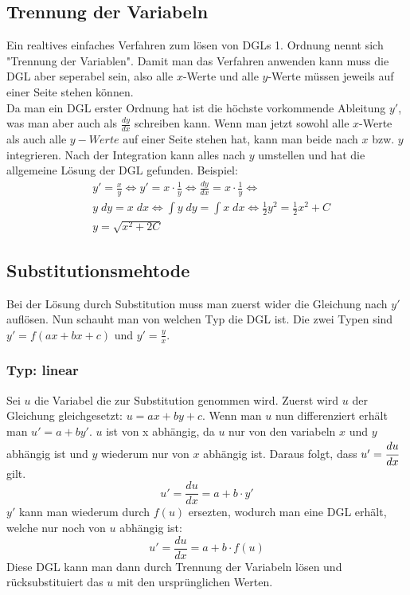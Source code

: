 \documentclass[a4paper,10pt]{scrartcl}
\begin{document}
        \subsection{Trennung der Variabeln}
        Ein realtives einfaches Verfahren zum lösen von DGLs 1. Ordnung nennt sich "Trennung der Variablen". Damit man das Verfahren anwenden kann muss die DGL aber
        seperabel sein, also alle \(x\)-Werte und alle \(y\)-Werte müssen jeweils auf einer Seite stehen können. \\
        Da man ein DGL erster Ordnung hat ist die höchste vorkommende Ableitung \(y'\), was man aber auch als \(\frac{dy}{dx}\) schreiben kann. Wenn man jetzt sowohl alle 
        \(x\)-Werte als auch alle \(y-Werte\) auf einer Seite stehen hat, kann man beide nach \(x\) bzw. \(y\) integrieren. Nach der Integration kann alles nach \(y\) umstellen
        und hat die allgemeine Lösung der DGL gefunden. Beispiel:
        \begin{equation}
            \begin{aligned}  
            & y' = \frac{x}{y} \Leftrightarrow y' = x \cdot \frac{1}{y} \Leftrightarrow \frac{dy}{dx} = x \cdot \frac{1}{y}  \Leftrightarrow \\
            & y \; dy = x \; dx  \Leftrightarrow \int y \; dy = \int x \; dx \Leftrightarrow \frac{1}{2} y^2 = \frac{1}{2} x^2 + C \\
            & y = \sqrt{x^2 + 2C}
            \end{aligned}  
        \end{equation}
        
        \subsection{Substitutionsmehtode}
        Bei der Lösung durch Substitution muss man zuerst wider die Gleichung nach \(y'\) auflösen. Nun schauht man von welchen Typ die DGL ist.
        Die zwei Typen sind \(y' = f(ax + bx + c)\) und \(y' = \frac{y}{x}\).
        \subsubsection{Typ: linear}
        Sei \(u\) die Variabel die zur Substitution genommen wird. Zuerst wird \(u\) der Gleichung gleichgesetzt: \(u = ax + by +c\). Wenn man \(u\) nun
        differenziert erhält man \(u' = a + by'\). \(u\) ist von x abhängig, da \(u\) nur von den variabeln \(x\) und \(y\) abhängig ist und \(y\) wiederum 
        nur von \(x\) abhängig ist. Daraus folgt, dass \(u' = \cfrac{du}{dx}\) gilt. 
        \begin{equation}
            u' = \frac{du}{dx} = a + b \cdot y'
        \end{equation}
        \(y'\) kann man wiederum durch \(f(u)\) ersezten, wodurch man eine DGL erhält, welche nur noch von \(u\) abhängig ist: 
        \begin{equation}
            u' = \frac{du}{dx} = a + b \cdot f(u)
        \end{equation}
        Diese DGL kann man dann durch Trennung der Variabeln lösen und rücksubstituiert das \(u\) mit den ursprünglichen Werten.
\end{document}
